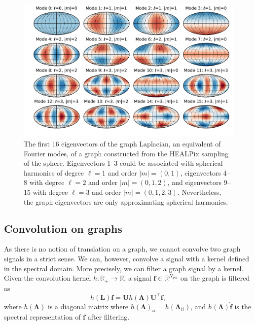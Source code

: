 \documentclass[final,twocolumn,3p,times,authoryear]{elsarticle}
\renewcommand{\b}[1]{{\bm{#1}}}   %
\newcommand{\1}{\b{1}}              %
\newcommand{\0}{\b{0}}              %
\renewcommand{\L}{\b{L}}
\newcommand{\U}{\b{U}}
\newcommand{\f}{\b{f}}
\newcommand{\trans}{^\intercal}
\newcommand{\R}{\mathbb{R}}
\newcommand{\bLambda}{\b{\Lambda}}
\begin{document}
\begin{figure}
	\centering
	\includegraphics[width=\linewidth]{eigenvectors}
	\caption{The first 16 eigenvectors of the graph Laplacian, an equivalent of Fourier modes, of a graph constructed from the HEALPix sampling of the sphere.
    Eigenvectors 1--3 could be associated with spherical harmonics of degree $\ell=1$ and order $|m|=(0,1)$, eigenvectors 4--8 with degree $\ell=2$ and order $|m|=(0,1,2)$, and eigenvectors 9--15 with degree $\ell=3$ and order $|m|=(0,1,2,3)$.
    Nevertheless, the graph eigenvectors are only approximating spherical harmonics.}
	\label{fig:graph_harmonics}
\end{figure}

\subsection{Convolution on graphs}
\label{sec:graph_convolution}


As there is no notion of translation on a graph, we cannot convolve two graph signals in a strict sense.
We can, however, convolve a signal with a kernel defined in the spectral domain.
More precisely, we can filter a graph signal by a kernel.
Given the convolution kernel
$h: \R_+ \rightarrow \R$, a signal $\f \in \R^{N_{pix}}$ on the graph is filtered as
\begin{equation} \label{eqn:graph_convolution}
	h(\L) \f = \U h(\bLambda) \U\trans \f,
\end{equation}
where $h(\bLambda)$ is a diagonal matrix where $h(\bLambda)_{ii} = h(\bLambda_{ii})$, and $h(\bLambda) \hat{\f}$ is the spectral representation of $\f$ after filtering.
\end{document}
